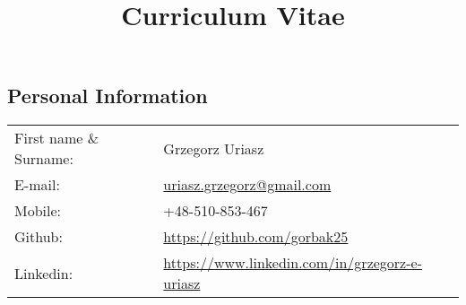 \documentclass[margin,line,pifont,palatino,courier]{res}
\begin{document}
\title{Curriculum Vitae}
\begin{resume}

\section{\sc Personal Information}

\vspace{.05in}
\begin{tabular}{@{}p{1.8in}p{3in}}
First name \& Surname: & Grzegorz Uriasz \\
E-mail: & \href{mailto:uriasz.grzegorz@gmail.com}{uriasz.grzegorz@gmail.com} \\
Mobile: & +48-510-853-467 \\
Github: & \href{https://github.com/gorbak25}{https://github.com/gorbak25} \\
Linkedin: & \href{https://www.linkedin.com/in/grzegorz-e-uriasz}{https://www.linkedin.com/in/grzegorz-e-uriasz} \\
\end{tabular}







\end{resume}
\end{document}

